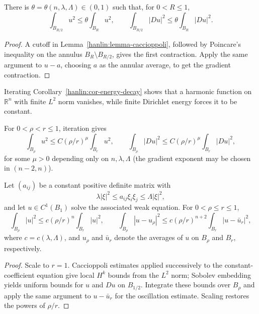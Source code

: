 \begin{corollary}\label{hanlin:cor-energy-decay}
There is $\theta=\theta(n,\lambda,\Lambda)\in(0,1)$ such that, for $0<R\le1$,
\[
\int_{B_{R/2}}u^2\le\theta\int_{B_R}u^2,
\qquad
\int_{B_{R/2}}|Du|^2\le\theta\int_{B_R}|Du|^2.
\]
\end{corollary}
\begin{proof}
\sketch A cutoff in Lemma~\ref{hanlin:lemma-caccioppoli}, followed by Poincare's
inequality on the annulus $B_R\setminus B_{R/2}$, gives the first contraction.
Apply the same argument to $u-a$, choosing $a$ as the annular average, to get
the gradient contraction.
\end{proof}

\begin{remark}\label{hanlin:remark-finite-energy-liouville}
Iterating Corollary~\ref{hanlin:cor-energy-decay} shows that a harmonic function
on $\mathbb R^n$ with finite $L^2$ norm vanishes, while finite Dirichlet energy
forces it to be constant.
\end{remark}

\begin{remark}\label{hanlin:remark-iterated-energy-decay}
For $0<\rho<r\le1$, iteration gives
\[
\int_{B_\rho}u^2\le C(\rho/r)^\mu\int_{B_r}u^2,\qquad
\int_{B_\rho}|Du|^2\le C(\rho/r)^\mu\int_{B_r}|Du|^2,
\]
for some $\mu>0$ depending only on $n,\lambda,\Lambda$ (the gradient exponent
may be chosen in $(n-2,n)$).
\end{remark}

\begin{lemma}\label{hanlin:lemma-constant-coeff-compactness}
Let $(a_{ij})$ be a constant positive definite matrix with
\[
\lambda|\xi|^2\le a_{ij}\xi_i\xi_j\le\Lambda|\xi|^2,
\]
and let $u\in C^1(B_1)$ solve the associated weak equation. For
$0<\rho\le r\le1$,
\[
\int_{B_\rho}|u|^2\le c(\rho/r)^n\int_{B_r}|u|^2,
\qquad
\int_{B_\rho}|u-u_\rho|^2\le c(\rho/r)^{n+2}\int_{B_r}|u-\bar u_r|^2,
\]
where $c=c(\lambda,\Lambda)$, and $u_\rho$ and $\bar u_r$ denote the averages
of $u$ on $B_\rho$ and $B_r$, respectively.
\end{lemma}
\begin{proof}
\sketch Scale to $r=1$. Caccioppoli estimates applied successively to the
constant-coefficient equation give local $H^k$ bounds from the $L^2$ norm;
Sobolev embedding yields uniform bounds for $u$ and $Du$ on $B_{1/2}$. Integrate
these bounds over $B_\rho$ and apply the same argument to $u-\bar u_r$ for the
oscillation estimate. Scaling restores the powers of $\rho/r$.
\end{proof}
